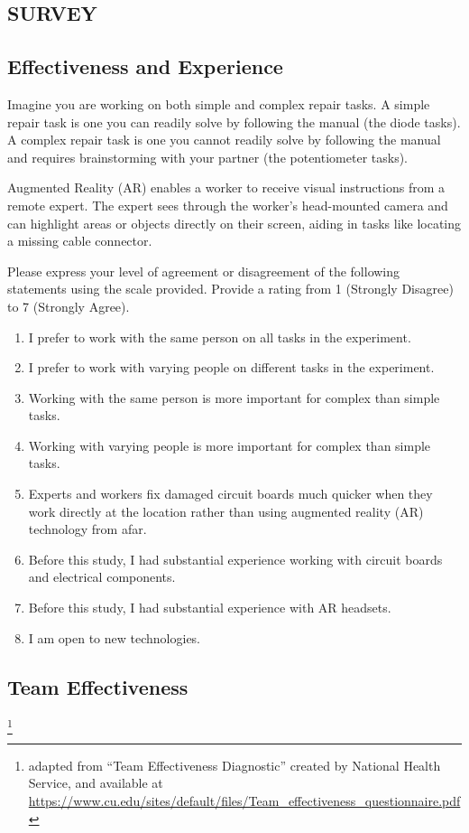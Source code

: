 \documentclass[msom,nonblindrev]{01 latex/class/informs3}
\begin{document}
\begin{APPENDICES}
\section{SURVEY}\label{app:survey}
\subsection{Effectiveness and Experience}
Imagine you are working on both simple and complex repair tasks. A simple repair task is one you can readily solve by following the manual (the diode tasks). A complex repair task is one you cannot readily solve by following the manual and requires brainstorming with your partner (the potentiometer tasks). 

Augmented Reality (AR) enables a worker to receive visual instructions from a remote expert. The expert sees through the worker's head-mounted camera and can highlight areas or objects directly on their screen, aiding in tasks like locating a missing cable connector.

Please express your level of agreement or disagreement of the following statements using the scale provided. Provide a rating from 1 (Strongly Disagree) to 7 (Strongly Agree).

\begin{enumerate}
    \item I prefer to work with the same person on all tasks in the experiment.
    \item I prefer to work with varying people on different tasks in the experiment.
    \item Working with the same person is more important for complex than simple tasks.
    \item Working with varying people is more important for complex than simple tasks.
    \item Experts and workers fix damaged circuit boards much quicker when they work directly at the location rather than using augmented reality (AR) technology from afar.
    \item Before this study, I had substantial experience working with circuit boards and electrical components.
    \item Before this study, I had substantial experience with AR headsets.
    \item I am open to new technologies.                        
\end{enumerate}


\subsection{Team Effectiveness}\footnote{adapted from ``Team Effectiveness Diagnostic'' created by National Health Service, and available at \url{https://www.cu.edu/sites/default/files/Team_effectiveness_questionnaire.pdf}}


\end{APPENDICES}
\end{document}
